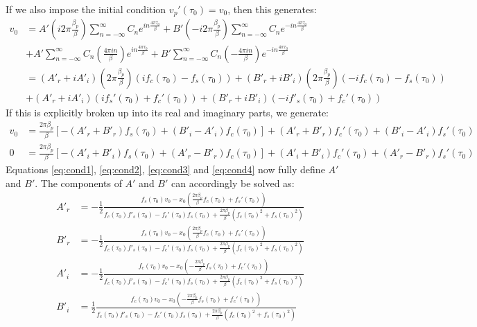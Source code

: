\documentclass{article}
\begin{document}
If we also impose the initial condition $v_p' (\tau_0) = v_0$, then this generates:
\begin{align}
v_0 & = A' \left( i 2 \pi \frac{\beta_p}{\beta} \right) \sum_{n = - \infty}^{\infty} C_{n} e^{i n \frac{4 \pi \tau_0}{\beta}} + B' \left( - i 2 \pi \frac{\beta_p}{\beta} \right) \sum_{n = - \infty}^{\infty} C_{n} e^{- i n \frac{4 \pi \tau_0}{\beta}} \nonumber \\
	& + A' \sum_{n = - \infty}^{\infty} C_{n} \left(\frac{4 \pi i n}{\beta} \right) e^{i n \frac{4 \pi \tau_0}{\beta}} + B' \sum_{n = - \infty}^{\infty} C_{n} \left(- \frac{4 \pi i n}{\beta} \right) e^{-i n \frac{4 \pi \tau_0}{\beta}} \\
	& = (A'_r + i A'_i) \left(2 \pi \frac{\beta_p}{\beta} \right) (i f_c (\tau_0) - f_s (\tau_0)) + (B'_r + i B'_i) \left(2 \pi \frac{\beta_p}{\beta} \right) (- i f_c (\tau_0) - f_s (\tau_0)) \nonumber \\
	& + (A'_r + i A'_i) (i f_s' (\tau_0) + f_c'(\tau_0)) + (B'_r + i B'_i) (- i f'_s (\tau_0) + f_c' (\tau_0))
\end{align}
If this is explicitly broken up into its real and imaginary parts, we generate:
\begin{align}
v_0 & = \frac{2 \pi \beta_p}{\beta} [ - (A'_r + B'_r ) f_s(\tau_0) + (B'_i - A'_i) f_c (\tau_0) ] + (A'_r + B'_r) f_c'(\tau_0) + (B'_i - A'_i) f_s'(\tau_0) \label{eq:cond3} \\
0 & = \frac{2 \pi \beta_p}{\beta} [ - (A'_i + B'_i) f_s(\tau_0) + (A'_r - B'_r) f_c (\tau_0) ] + (A'_i + B'_i) f_c'(\tau_0) + (A'_r - B'_r) f_s'(\tau_0) \label{eq:cond4}
\end{align}
Equations \eqref{eq:cond1}, \eqref{eq:cond2}, \eqref{eq:cond3} and \eqref{eq:cond4} now fully define $A'$ and $B'$. The components of $A'$ and $B'$ can accordingly be solved as:
\begin{align}
A'_r & = - \frac{1}{2} \frac{f_s (\tau_0) v_0 - x_0 \left( \frac{2 \pi \beta_p}{\beta} f_c (\tau_0) + f_s' (\tau_0) \right)}{f_c (\tau_0) f'_s (\tau_0) - f_c' (\tau_0) f_s (\tau_0) + \frac{2 \pi \beta_p}{\beta} (f_c (\tau_0)^2 + f_s (\tau_0)^2 ) }	\label{eq:Ar} \\
B'_r & = - \frac{1}{2} \frac{f_s (\tau_0) v_0 - x_0 \left( \frac{2 \pi \beta_p}{\beta} f_c (\tau_0) + f_s' (\tau_0) \right)}{f_c (\tau_0) f'_s (\tau_0) - f_c' (\tau_0) f_s (\tau_0) + \frac{2 \pi \beta_p}{\beta} (f_c (\tau_0)^2 + f_s (\tau_0)^2 ) }	\label{eq:Br} \\
A'_i & = - \frac{1}{2} \frac{f_c (\tau_0) v_0 - x_0 \left( - \frac{2 \pi \beta_p}{\beta} f_s (\tau_0) + f_c' (\tau_0) \right) }{f_c (\tau_0) f'_s (\tau_0) - f_c' (\tau_0) f_s (\tau_0) + \frac{2 \pi \beta_p}{\beta} (f_c (\tau_0)^2 + f_s (\tau_0)^2 ) } \label{eq:Ai} \\
B'_i & = \frac{1}{2} \frac{f_c (\tau_0) v_0 - x_0 \left( - \frac{2 \pi \beta_p}{\beta} f_s (\tau_0) + f_c' (\tau_0) \right)}{f_c (\tau_0) f'_s (\tau_0) - f_c' (\tau_0) f_s (\tau_0) + \frac{2 \pi \beta_p}{\beta} (f_c (\tau_0)^2 + f_s (\tau_0)^2 ) } \label{eq:Bi}
\end{align}
\end{document}
